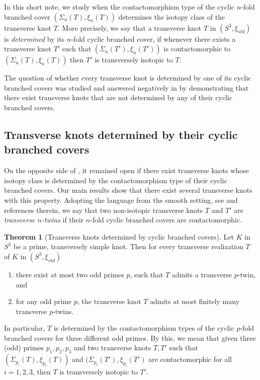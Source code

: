 \documentclass[11pt]{amsart}
\theoremstyle{definition}
\theoremstyle{definition}
\theoremstyle{definition}
\theoremstyle{definition}
\newtheorem{theorem}{Theorem}[section]
\begin{document}
In this short note, we study when the contactomorphism type of the cyclic $n$-fold branched cover $(\Sigma_n(T),\xi_n(T))$ determines the isotopy class of the transverse knot $T$. More precisely, we say that a transverse knot $T$ in $(S^3,\xi_{std})$ is \textit{determined} by its $n$-fold cyclic branched cover, if whenever there exists a transverse knot $T'$ such that $(\Sigma_n(T'),\xi_n(T'))$ is contactomorphic to $(\Sigma_n(T),\xi_n(T))$ then $T'$ is transversely isotopic to $T$.

The question of whether every transverse knot is determined by one of its cyclic branched covers was studied and answered negatively in \cite{Harvey_br_covers} by demonstrating that there exist transverse knots that are not determined by any of their cyclic branched covers.

\subsection{Transverse knots determined by their cyclic branched covers}
On the opposite side of \cite{Harvey_br_covers}, it remained open if there exist transverse knots whose isotopy class is determined by the contactomorphism type of their cyclic branched covers. Our main results show that there exist several transverse knots with this property.
Adopting the language from the smooth setting, see \cite{Paoluzzi_survey} and references therein, we say that two non-isotopic transverse knots $T$ and $T'$ are \textit{transverse $n$-twins} if their $n$-fold cyclic branched covers are contactomorphic.

\begin{theorem}[Transverse knots determined by cyclic branched covers]\label{thm:transverse_knots_determined}
    Let $K$ in $S^3$ be a prime, transversely simple knot. Then for every transverse realization $T$ of $K$ in $(S^3,\xi_{std})$
    \begin{enumerate}
        \item there exist at most two odd primes $p$, such that $T$ admits a transverse $p$-twin, and
        \item for any odd prime $p$, the transverse knot $T$ admits at most finitely many transverse $p$-twins.
    \end{enumerate} 
\end{theorem}
 In particular, $T$ is determined by the contactomorphism types of the cyclic $p$-fold branched covers for three different odd primes. By this, we mean that given three (odd) primes $p_1,p_2,p_3$ and two transverse knots $T,T'$ such that $(\Sigma_{p_i}(T),\xi_{p_i}(T))$ and $(\Sigma_{p_i}(T'),\xi_{p_i}(T')$ are contactomorphic for all $i=1,2,3$, then $T$ is transversely isotopic to $T'$.
\end{document}
